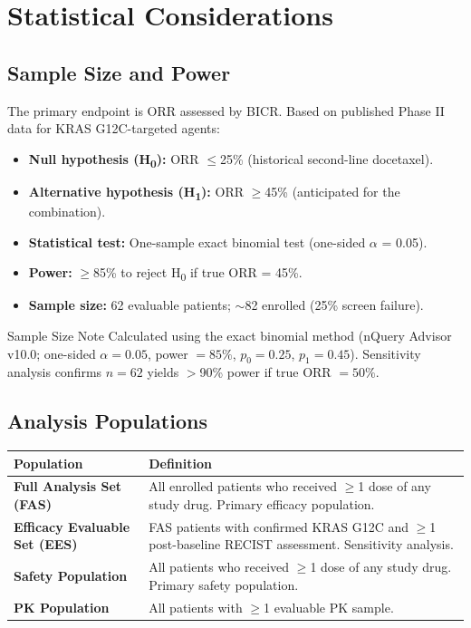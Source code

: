 \section{Statistical Considerations}
\label{sec:stats}

\subsection{Sample Size and Power}

The primary endpoint is ORR assessed by BICR. Based on published Phase II data for KRAS G12C-targeted agents:

\begin{itemize}
  \item \textbf{Null hypothesis (H\textsubscript{0}):} ORR $\leq$25\% (historical second-line docetaxel).
  \item \textbf{Alternative hypothesis (H\textsubscript{1}):} ORR $\geq$45\% (anticipated for the combination).
  \item \textbf{Statistical test:} One-sample exact binomial test (one-sided $\alpha$ = 0.05).
  \item \textbf{Power:} $\geq$85\% to reject H\textsubscript{0} if true ORR = 45\%.
  \item \textbf{Sample size:} 62 evaluable patients; $\sim$82 enrolled (25\% screen failure).
\end{itemize}

\begin{protocolnote}{\faChartBar\quad Sample Size Note}
  Calculated using the exact binomial method (nQuery Advisor v10.0; one-sided $\alpha=0.05$, power $=85\%$, $p_0=0.25$, $p_1=0.45$). Sensitivity analysis confirms $n=62$ yields $>$90\% power if true ORR $=50\%$.
\end{protocolnote}

\subsection{Analysis Populations}

\renewcommand{\arraystretch}{1.4}
\begin{tabularx}{\linewidth}{@{}>{\color{accent}\bfseries}l@{\hspace{6mm}}>{\raggedright\arraybackslash}X@{}}
  \toprule
  Population & Definition \\
  \midrule
  Full Analysis Set (FAS) & All enrolled patients who received $\geq$1 dose of any study drug. Primary efficacy population. \\
  Efficacy Evaluable Set (EES) & FAS patients with confirmed KRAS G12C and $\geq$1 post-baseline RECIST assessment. Sensitivity analysis. \\
  Safety Population & All patients who received $\geq$1 dose of any study drug. Primary safety population. \\
  PK Population & All patients with $\geq$1 evaluable PK sample. \\
  \bottomrule
\end{tabularx}
\renewcommand{\arraystretch}{1.35}

